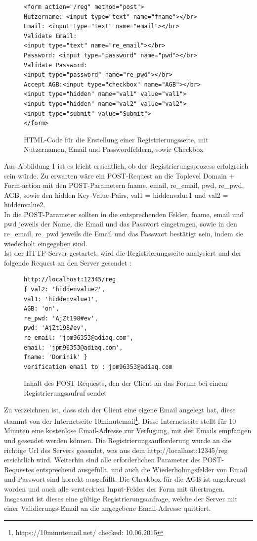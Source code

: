 \begin{figure}[h!]
\begin{lstlisting}[language=HTML5]
<form action="/reg" method="post">
Nutzername: <input type="text" name="fname"></br>
Email: <input type="text" name="email"></br>
Validate Email: 
<input type="text" name="re_email"></br>
Password: <input type="password" name="pwd"></br>
Validate Password: 
<input type="password" name="re_pwd"></br>
Accept AGB:<input type="checkbox" name="AGB"></br>
<input type="hidden" name="val1" value="val1">
<input type="hidden" name="val2" value="val2">
<input type="submit" value="Submit">
</form>
\end{lstlisting}
\caption{HTML-Code für die Erstellung einer Registrierungsseite, mit Nutzernamen, Email und Passwordfeldern, sowie Checkbox}
\end{figure}

Aus Abbildung 1 ist es leicht ersichtlich, ob der Registrierungsprozess erfolgreich sein würde. Zu erwarten wäre ein POST-Request an die Toplevel Domain + Form-action mit den POST-Parametern fname, email, re\_email, pwd, re\_pwd, AGB, sowie den hidden Key-Value-Pairs, val1 = hiddenvalue1 und val2 = hiddenvalue2.\\
In die POST-Parameter sollten in die entsprechenden Felder, fname, email und pwd jeweils der Name, die Email und das Passwort eingetragen, sowie in den re\_email, re\_pwd jeweils die Email und das Passwort bestätigt sein, indem sie wiederholt eingegeben sind.\\
Ist der HTTP-Server gestartet, wird die Registrierungsseite analysiert und der folgende Request an den Server gesendet :

\begin{figure}[ht]
\begin{lstlisting}[language=HTML5]
http://localhost:12345/reg
{ val2: 'hiddenvalue2',
val1: 'hiddenvalue1',
AGB: 'on',
re_pwd: 'AjZt198#ev',
pwd: 'AjZt198#ev',
re_email: 'jpm96353@adiaq.com',
email: 'jpm96353@adiaq.com',
fname: 'Dominik' }
verification email to : jpm96353@adiaq.com
\end{lstlisting}
\caption{Inhalt des POST-Requests, den der Client an das Forum bei einem Registrierungsaufruf sendet}
\end{figure}

Zu verzeichnen ist, dass sich der Client eine eigene Email angelegt hat, diese stammt von der Internetseite 10minutemail\footnote{https://10minutemail.net/ checked: 10.06.2015}.
Diese Internetseite stellt für 10 Minuten eine kostenlose Email-Adresse zur Verfügung, mit der Emails empfangen und gesendet werden können. Die Registrierungsaufforderung wurde an die richtige Url des Servers gesendet, was aus dem http://localhost:12345/reg ersichtlich wird. Weiterhin sind alle erforderlichen Parameter des POST-Requestes entsprechend ausgefüllt, und auch die Wiederholungsfelder von Email und Passwort sind korrekt ausgefüllt. Die Checkbox für die AGB ist angekreuzt worden und auch alle versteckten Input-Felder der Form mit übertragen. Insgesamt ist dieses eine gültige Registrierungsanfrage, welche der Server mit einer Validierungs-Email an die angegebene Email-Adresse quittiert.

